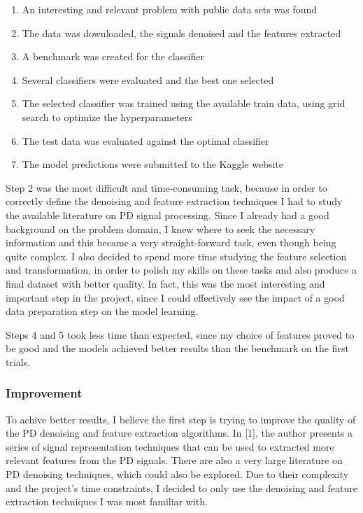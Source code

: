 \documentclass[11pt]{article}
\providecommand{\tightlist}{%
      \setlength{\itemsep}{0pt}\setlength{\parskip}{0pt}}
\begin{document}
\begin{enumerate}
\def\labelenumi{\arabic{enumi}.}
\tightlist
\item
  An interesting and relevant problem with public data sets was found
\item
  The data was downloaded, the signals denoised and the features
  extracted
\item
  A benchmark was created for the classifier
\item
  Several classifiers were evaluated and the best one selected
\item
  The selected classifier was trained using the available train data,
  using grid search to optimize the hyperparameters
\item
  The test data was evaluated against the optimal classifier
\item
  The model predictions were submitted to the Kaggle website
\end{enumerate}

Step 2 was the most difficult and time-consuming task, because in order
to correctly define the denoising and feature extraction techniques I
had to study the available literature on PD signal processing. Since I
already had a good background on the problem domain, I knew where to
seek the necessary information and this became a very straight-forward
task, even though being quite complex. I also decided to spend more time
studying the feature selection and transformation, in order to polish my
skills on these tasks and also produce a final dataset with better
quality. In fact, this was the most interesting and important step in
the project, since I could effectively see the impact of a good data
preparation step on the model learning.

Steps 4 and 5 took less time than expected, since my choice of features
proved to be good and the models achieved better results than the
benchmark on the first trials.

\hypertarget{improvement}{%
\subsubsection{Improvement}\label{improvement}}

To achive better results, I believe the first step is trying to improve
the quality of the PD denoising and feature extraction algorithms. In
{[}1{]}, the author presents a series of signal representation
techniques that can be used to extracted more relevant features from the
PD signals. There are also a very large literature on PD denoising
techniques, which could also be explored. Due to their complexity and
the project's time constraints, I decided to only use the denoising and
feature extraction techniques I was most familiar with.
\end{document}
